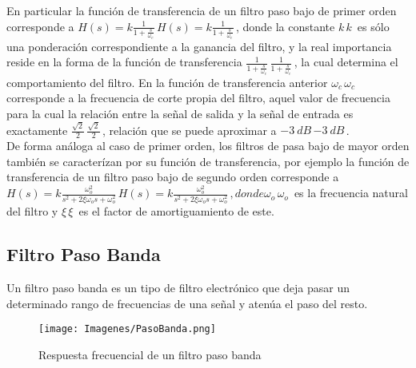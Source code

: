 \documentclass{article}
\begin{document}
En particular la función de transferencia de un filtro paso bajo de primer orden corresponde a ${\displaystyle H(s)=k{\frac {1}{1+{\frac {s}{\omega _{c}}}}}\,\!} {\displaystyle H(s)=k{\frac {1}{1+{\frac {s}{\omega _{c}}}}}\,\!}$, donde la constante ${\displaystyle k\,\!} {\displaystyle k\,\!}$ es sólo una ponderación correspondiente a la ganancia del filtro, y la real importancia reside en la forma de la función de transferencia ${\displaystyle {\frac {1}{1+{\frac {s}{\omega _{c}}}}}\,\!} {\displaystyle {\frac {1}{1+{\frac {s}{\omega _{c}}}}}\,\!}$, la cual determina el comportamiento del filtro. En la función de transferencia anterior ${\displaystyle \omega _{c}\,\!} {\displaystyle \omega _{c}\,\!}$ corresponde a la frecuencia de corte propia del filtro, aquel valor de frecuencia para la cual la relación entre la señal de salida y la señal de entrada es exactamente ${\displaystyle {\frac {\sqrt {2}}{2}}\,\!} {\displaystyle {\frac {\sqrt {2}}{2}}\,\!}$, relación que se puede aproximar a ${\displaystyle -3\ dB\,\!} {\displaystyle -3\ dB\,\!}$.\citep{FiltroPasoBajo}\\

De forma análoga al caso de primer orden, los filtros de pasa bajo de mayor orden también se caracterízan por su función de transferencia, por ejemplo la función de transferencia de un filtro paso bajo de segundo orden corresponde a ${\displaystyle H(s)=k{\frac {\omega _{o}^{2}}{s^{2}+2\xi \omega _{o}s+\omega _{o}^{2}}}\,\!} {\displaystyle H(s)=k{\frac {\omega _{o}^{2}}{s^{2}+2\xi \omega _{o}s+\omega _{o}^{2}}}\,\!}, donde {\displaystyle \omega _{o}\,\!} {\displaystyle \omega _{o}\,\!}$ es la frecuencia natural del filtro y ${\displaystyle \xi \,\!} {\displaystyle \xi \,\!}$ es el factor de amortiguamiento de este.\citep{FiltroPasoBajo}\\


\subsection{Filtro Paso Banda}

Un filtro paso banda es un tipo de filtro electrónico que deja pasar un determinado rango de frecuencias de una señal y atenúa el paso del resto.\citep{FiltroPasoBanda}


\begin{figure}[h!]
    \centering
    \texttt{[image: Imagenes/PasoBanda.png]}
    \caption{Respuesta frecuencial de un filtro paso banda\citep{FiltroPasoBanda}}
    \label{fig:filtroPasoBanda}
\end{figure}
\end{document}
